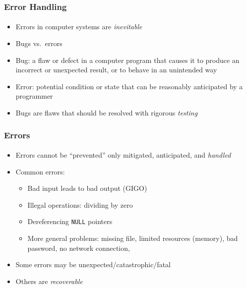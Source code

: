 \documentclass[]{beamer}
\begin{document}
\begin{frame}
    \frametitle{Error Handling}
    \framesubtitle{}

\begin{itemize}[<+->]
  \item Errors in computer systems are \emph{inevitable}
  \item Bugs vs.\ errors
  \item Bug: a flaw or defect in a computer program that causes it to produce an incorrect or unexpected result, or to behave in an unintended way
  \item Error: potential condition or state that can be reasonably anticipated by a programmer
  \item Bugs are flaws that should be resolved with rigorous \emph{testing}
\end{itemize}

\end{frame}


\begin{frame}[fragile]
    \frametitle{Errors}
    \framesubtitle{}


\begin{itemize}[<+->]
  \item Errors cannot be ``prevented'' only mitigated, anticipated, and \emph{handled}
  \item Common errors:
  \begin{itemize}
    \item Bad input leads to bad output (GIGO)
    \item Illegal operations: dividing by zero
    \item Dereferencing \texttt{NULL} pointers
    \item More general problems: missing file, limited resources (memory), bad password, no network connection, 
  \end{itemize}
  \item Some errors may be unexpected/catastrophic/fatal
  \item Others are \emph{recoverable}
\end{itemize}

\end{frame}
\end{document}
